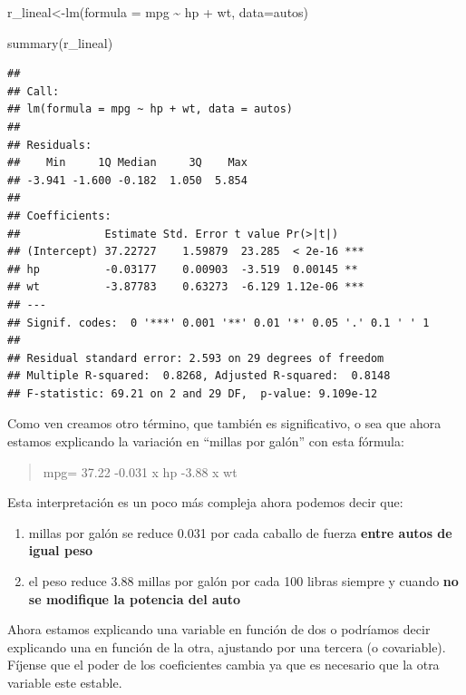 \documentclass[
]{book}
\newenvironment{Shaded}{\begin{snugshade}}{\end{snugshade}}
\newcommand{\AttributeTok}[1]{\textcolor[rgb]{0.77,0.63,0.00}{#1}}
\newcommand{\FunctionTok}[1]{\textcolor[rgb]{0.00,0.00,0.00}{#1}}
\newcommand{\NormalTok}[1]{#1}
\newcommand{\OtherTok}[1]{\textcolor[rgb]{0.56,0.35,0.01}{#1}}
\newcommand{\SpecialCharTok}[1]{\textcolor[rgb]{0.00,0.00,0.00}{#1}}
\begin{document}
\begin{Shaded}
\begin{Highlighting}[]
\NormalTok{r\_lineal}\OtherTok{\textless{}{-}}\FunctionTok{lm}\NormalTok{(}\AttributeTok{formula =}\NormalTok{ mpg }\SpecialCharTok{\textasciitilde{}}\NormalTok{ hp }\SpecialCharTok{+}\NormalTok{ wt, }\AttributeTok{data=}\NormalTok{autos)}

\FunctionTok{summary}\NormalTok{(r\_lineal)}
\end{Highlighting}
\end{Shaded}

\begin{verbatim}
## 
## Call:
## lm(formula = mpg ~ hp + wt, data = autos)
## 
## Residuals:
##    Min     1Q Median     3Q    Max 
## -3.941 -1.600 -0.182  1.050  5.854 
## 
## Coefficients:
##             Estimate Std. Error t value Pr(>|t|)    
## (Intercept) 37.22727    1.59879  23.285  < 2e-16 ***
## hp          -0.03177    0.00903  -3.519  0.00145 ** 
## wt          -3.87783    0.63273  -6.129 1.12e-06 ***
## ---
## Signif. codes:  0 '***' 0.001 '**' 0.01 '*' 0.05 '.' 0.1 ' ' 1
## 
## Residual standard error: 2.593 on 29 degrees of freedom
## Multiple R-squared:  0.8268, Adjusted R-squared:  0.8148 
## F-statistic: 69.21 on 2 and 29 DF,  p-value: 9.109e-12
\end{verbatim}

Como ven creamos otro término, que también es significativo, o sea que ahora estamos explicando la variación en ``millas por galón'' con esta fórmula:

\begin{quote}
mpg= 37.22 -0.031 x hp -3.88 x wt
\end{quote}

Esta interpretación es un poco más compleja ahora podemos decir que:

\begin{enumerate}
\def\labelenumi{\arabic{enumi}.}
\item
  millas por galón se reduce 0.031 por cada caballo de fuerza \textbf{entre autos de igual peso}
\item
  el peso reduce 3.88 millas por galón por cada 100 libras siempre y cuando \textbf{no se modifique la potencia del auto}
\end{enumerate}

Ahora estamos explicando una variable en función de dos o podríamos decir explicando una en función de la otra, ajustando por una tercera (o covariable). Fíjense que el poder de los coeficientes cambia ya que es necesario que la otra variable este estable.
\end{document}
